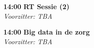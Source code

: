 \documentclass[a4paper,10pt]{report}
\begin{document}
\begin{multicols*}{3}



\begin{packed_enum}
\item[\textbf{14:00}] \textbf{RT Sessie (2)}\\\textit{Voorzitter: TBA}
\end{packed_enum}

{}
\begin{packed_enum}
\item[\textbf{14:00}] \textbf{Big data in de zorg}\\\textit{Voorzitter: TBA}
\end{packed_enum}


\end{multicols*}
\end{document}
